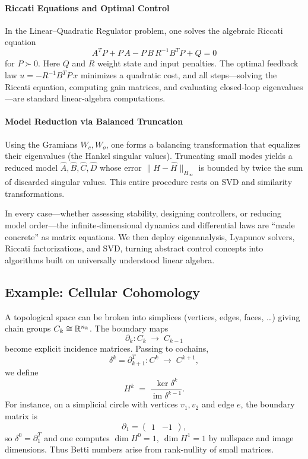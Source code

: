 \paragraph{Riccati Equations and Optimal Control}  
In the Linear–Quadratic Regulator problem, one solves the algebraic Riccati equation
\[
A^T P + P\,A - P\,B\,R^{-1}B^T P + Q = 0
\]
for \(P\succ0\).  Here \(Q\) and \(R\) weight state and input penalties.  The optimal feedback law \(u = -R^{-1}B^T P\,x\) minimizes a quadratic cost, and all steps—solving the Riccati equation, computing gain matrices, and evaluating closed‐loop eigenvalues—are standard linear‐algebra computations.

\paragraph{Model Reduction via Balanced Truncation}  
Using the Gramians \(W_c,W_o\), one forms a balancing transformation that equalizes their eigenvalues (the Hankel singular values).  Truncating small modes yields a reduced model \(\hat A,\hat B,\hat C,\hat D\) whose error \(\|H-\hat H\|_{H_\infty}\) is bounded by twice the sum of discarded singular values.  This entire procedure rests on SVD and similarity transformations.

\medskip

In every case—whether assessing stability, designing controllers, or reducing model order—the infinite‐dimensional dynamics and differential laws are “made concrete” as matrix equations.  We then deploy eigenanalysis, Lyapunov solvers, Riccati factorizations, and SVD, turning abstract control concepts into algorithms built on universally understood linear algebra.  















\subsection{Example: Cellular Cohomology}  
A topological space can be broken into simplices (vertices, edges, faces, \dots) giving chain groups \(C_k\cong\Bbb R^{n_k}\).  The boundary maps
\[
\partial_k: C_k \;\longrightarrow\; C_{k-1}
\]
become explicit incidence matrices.  Passing to cochains,
\[
\delta^{k} = \partial_{k+1}^{T}: C^{k} \;\longrightarrow\; C^{k+1},
\]
we define
\[
H^k \;=\;\frac{\ker \delta^k}{\operatorname{im}\delta^{k-1}}.
\]
For instance, on a simplicial circle with vertices \(v_1,v_2\) and edge \(e\), the boundary matrix is
\[
\partial_1 = \begin{pmatrix}1 & -1\end{pmatrix},
\]
so \(\delta^0=\partial_1^T\) and one computes
\(\dim H^0=1,\ \dim H^1=1\)
by nullspace and image dimensions.  Thus Betti numbers arise from rank-nullity of small matrices.

